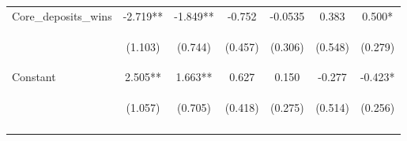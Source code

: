 \documentclass[]{article}
\begin{document}
\begin{center}
\begin{tabular}{lcccccc}
Core\_deposits\_wins & -2.719** & -1.849** & -0.752 & -0.0535 & 0.383 & 0.500* \\
\vspace{4pt} & \begin{footnotesize}(1.103)\end{footnotesize} & \begin{footnotesize}(0.744)\end{footnotesize} & \begin{footnotesize}(0.457)\end{footnotesize} & \begin{footnotesize}(0.306)\end{footnotesize} & \begin{footnotesize}(0.548)\end{footnotesize} & \begin{footnotesize}(0.279)\end{footnotesize} \\
Constant & 2.505** & 1.663** & 0.627 & 0.150 & -0.277 & -0.423* \\
 & \begin{footnotesize}(1.057)\end{footnotesize} & \begin{footnotesize}(0.705)\end{footnotesize} & \begin{footnotesize}(0.418)\end{footnotesize} & \begin{footnotesize}(0.275)\end{footnotesize} & \begin{footnotesize}(0.514)\end{footnotesize} & \begin{footnotesize}(0.256)\end{footnotesize} \\
\vspace{4pt} & \begin{footnotesize}\end{footnotesize} & \begin{footnotesize}\end{footnotesize} & \begin{footnotesize}\end{footnotesize} & \begin{footnotesize}\end{footnotesize} & \begin{footnotesize}\end{footnotesize} & \begin{footnotesize}\end{footnotesize} \\

\end{tabular}
\end{center}
\end{document}

